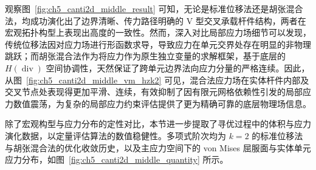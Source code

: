 观察图~\ref{fig:ch5_canti2d_middle_result} 可知，无论是标准位移法还是胡张混合法，均成功演化出了边界清晰、传力路径明确的 V 型交叉承载杆件结构，两者在宏观拓扑构型上表现出高度的一致性。然而，深入对比局部应力场细节可以发现，传统位移法因对应力场进行形函数求导，导致应力在单元交界处存在明显的非物理跳跃；而胡张混合法作为将应力作为原生独立变量的求解框架，基于底层的 $H(\operatorname{div})$ 空间协调性，天然保证了跨单元边界法向应力分量的严格连续。因此，从图~\ref{fig:ch5_canti2d_middle_vm_hzk2} 可见，混合法应力场在实体杆件内部及交叉节点处表现得更加平滑、连续，有效抑制了因有限元网格依赖性引发的局部应力数值震荡，为复杂的局部应力约束评估提供了更为精确可靠的底层物理场信息。

除了宏观构型与应力分布的定性对比，本节进一步提取了寻优过程中的体积与应力演化数据，以定量评估算法的数值稳健性。多项式阶次均为 $k=2$ 的标准位移法与胡张混合法的优化收敛历史，以及主应力空间下的 von Mises 屈服面与实体单元应力分布，如图~\ref{fig:ch5_canti2d_middle_quantity} 所示。

